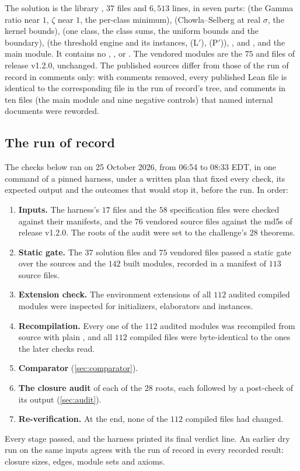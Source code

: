 \documentclass[11pt]{article}
\theoremstyle{definition}
\begin{document}
The solution is the library , $37$ files and $6{,}513$ lines, in seven parts:  (the Gamma ratio near $1$, $\zeta$ near $1$, the per-class minimum),  (Chowla--Selberg at real $\sigma$, the kernel bounds),  (one class, the class sums, the uniform bounds and the boundary),  (the threshold engine and its instances, (L$'$), (P$'$)), ,  and , and the main module. It contains no , ,  or . The vendored modules are the $75$  and  files of release v1.2.0, unchanged. The published sources differ from those of the run of record in comments only: with comments removed, every published Lean file is identical to the corresponding file in the run of record's tree, and comments in ten files (the main module and nine negative controls) that named internal documents were reworded.

\subsection{The run of record}\label{sec:record}

The checks below ran on 25 October 2026, from 06:54 to 08:33 EDT, in one command of a pinned harness, under a written plan that fixed every check, its expected output and the outcomes that would stop it, before the run. In order:
\begin{enumerate}[nosep]
\item \textbf{Inputs.} The harness's $17$ files and the $58$ specification files were checked against their manifests, and the $76$ vendored source files against the md5s of release v1.2.0. The roots of the audit were set to the challenge's $28$ theorems.
\item \textbf{Static gate.} The $37$ solution files and $75$ vendored files passed a static gate over the sources and the $142$ built modules, recorded in a manifest of $113$ source files.
\item \textbf{Extension check.} The environment extensions of all $112$ audited compiled modules were inspected for initializers, elaborators and instances.
\item \textbf{Recompilation.} Every one of the $112$ audited modules was recompiled from source with plain , and all $112$ compiled files were byte-identical to the ones the later checks read.
\item \textbf{Comparator} (\cref{sec:comparator}).
\item \textbf{The closure audit} of each of the $28$ roots, each followed by a post-check of its output (\cref{sec:audit}).
\item \textbf{Re-verification.} At the end, none of the $112$ compiled files had changed.
\end{enumerate}
Every stage passed, and the harness printed its final verdict line. An earlier dry run on the same inputs agrees with the run of record in every recorded result: closure sizes, edges, module sets and axioms.
\end{document}
